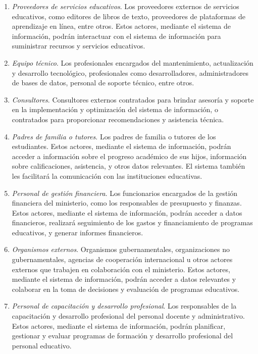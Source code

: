 \documentclass[a4paper, 9pt, conference]{article}              %
\theoremstyle{definition}
\begin{document}
\begin{enumerate}
	\item \emph{Proveedores de servicios educativos}. Los proveedores externos de servicios educativos, como editores de libros de texto, proveedores de plataformas de aprendizaje en l\'inea, entre otros. Estos actores, mediante el sistema de informaci\'on, podr\'an interactuar con el sistema de informaci\'on para suministrar recursos y servicios educativos.

	\item \emph{Equipo t\'ecnico}. Los profesionales encargados del mantenimiento, actualizaci\'on y desarrollo tecnol\'ogico, profesionales como desarrolladores, administradores de bases de datos, personal de soporte t\'ecnico, entre otros.

	\item \emph{Consultores}. Consultores externos contratados para brindar asesor\'ia y soporte en la implementaci\'on y optimizaci\'on del sistema de informaci\'on, o contratados para proporcionar recomendaciones y asistencia t\'ecnica.

	\item \emph{Padres de familia o tutores}. Los padres de familia o tutores de los estudiantes. Estos actores, mediante el sistema de informaci\'on, podr\'an acceder a informaci\'on sobre el progreso acad\'emico de sus hijos, informaci\'on sobre calificaciones, asistencia, y otros datos relevantes. El sistema tambi\'en les facilitar\'a la comunicaci\'on con las instituciones educativas.

	\item \emph{Personal de gesti\'on financiera}. Los funcionarios encargados de la gesti\'on financiera del ministerio, como los responsables de presupuesto y finanzas. Estos actores, mediante el sistema de informaci\'on, podr\'an acceder a datos financieros, realizar\'a seguimiento de los gastos y financiamiento de programas educativos, y generar informes financieros.

	\item \emph{Organismos externos}. Organismos gubernamentales, organizaciones no gubernamentales, agencias de cooperaci\'on internacional u otros actores externos que trabajen en colaboraci\'on con el ministerio. Estos actores, mediante el sistema de informaci\'on, podr\'an acceder a datos relevantes y colaborar en la toma de decisiones y evaluaci\'on de programas educativos.

	\item \emph{Personal de capacitaci\'on y desarrollo profesional}. Los responsables de la capacitaci\'on y desarrollo profesional del personal docente y administrativo. Estos actores, mediante el sistema de informaci\'on, podr\'an planificar, gestionar y evaluar programas de formaci\'on y desarrollo profesional del personal educativo.


\end{enumerate}
\end{document}
